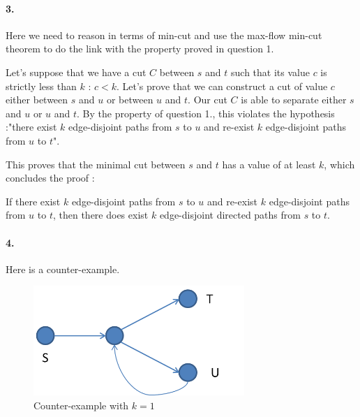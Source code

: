 \paragraph{3.}
Here we need to reason in terms of min-cut and use the max-flow min-cut theorem to do the link with the property proved in question 1.

Let's suppose that we have a cut $C$ between $s$ and $t$ such that its value $c$ is strictly less than $k$ : $c < k$.
Let's prove that we can construct a cut of value $c$ either between $s$ and $u$ or between $u$ and $t$. Our cut $C$ is able to separate either $s$ and $u$ or $u$ and $t$. By the property of question 1., this violates the hypothesis :"there exist $k$ edge-disjoint paths from $s$ to $u$ and re-exist $k$ edge-disjoint paths from $u$ to $t$".

This proves that the minimal cut between $s$ and $t$ has a value of at least $k$, which concludes the proof :

If there exist $k$ edge-disjoint paths from $s$ to $u$ and re-exist $k$ edge-disjoint paths from $u$ to $t$, then there does exist $k$ edge-disjoint directed paths from $s$ to $t$.





\paragraph{4.}
Here is a counter-example.

\begin{figure}[H]
\centering
\includegraphics[width=8cm]{fig4.png}
\caption{Counter-example with $k=1$}
\label{fig4}
\end{figure}